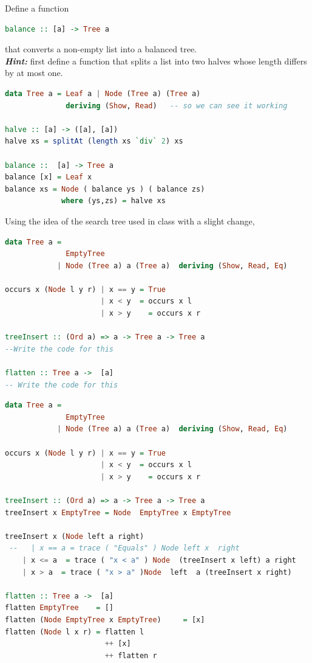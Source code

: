\documentclass{article}
\begin{document}
\begin{exercise}
Define a function 
\begin{lstlisting}[language=Haskell]
balance :: [a] -> Tree a
\end{lstlisting}
that converts a non-empty list into a balanced tree. \\
\textbf{\textit{Hint:}} first define a function that splits a list into two halves whose length differs by at most one. 

\end{exercise}
\begin{solution}
\begin{lstlisting}[language=Haskell]
data Tree a = Leaf a | Node (Tree a) (Tree a)
              deriving (Show, Read)   -- so we can see it working

halve :: [a] -> ([a], [a])
halve xs = splitAt (length xs `div` 2) xs 

balance ::  [a] -> Tree a
balance [x] = Leaf x
balance xs = Node ( balance ys ) ( balance zs)
             where (ys,zs) = halve xs
\end{lstlisting}
\pagebreak
\end{solution}
\begin{exercise}
Using the idea of the search tree used in class with a slight change, 
\begin{lstlisting}[language = Haskell]
data Tree a = 
              EmptyTree 
            | Node (Tree a) a (Tree a)  deriving (Show, Read, Eq)  

occurs x (Node l y r) | x == y = True
                      | x < y  = occurs x l
                      | x > y    = occurs x r

treeInsert :: (Ord a) => a -> Tree a -> Tree a  
--Write the code for this

flatten :: Tree a ->  [a]
-- Write the code for this
\end{lstlisting}
\end{exercise}
\begin{solution}
\begin{lstlisting}[language=Haskell]
data Tree a = 
              EmptyTree 
            | Node (Tree a) a (Tree a)  deriving (Show, Read, Eq)  

occurs x (Node l y r) | x == y = True
                      | x < y  = occurs x l
                      | x > y    = occurs x r

treeInsert :: (Ord a) => a -> Tree a -> Tree a  
treeInsert x EmptyTree = Node  EmptyTree x EmptyTree  
  
treeInsert x (Node left a right)   
 --   | x == a = trace ( "Equals" ) Node left x  right  
    | x <= a  = trace ( "x < a" ) Node  (treeInsert x left) a right  
    | x > a  = trace ( "x > a" )Node  left  a (treeInsert x right)  

flatten :: Tree a ->  [a]
flatten EmptyTree    = []
flatten (Node EmptyTree x EmptyTree)     = [x]
flatten (Node l x r) = flatten l
                       ++ [x]
                       ++ flatten r
\end{lstlisting}
\end{solution}
\end{document}
